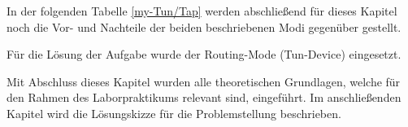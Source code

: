 \documentclass[
a4paper,     %
 headsepline, %
footsepline, %
titlepage,   %
 halfparskip,     %
 fleqn,       %
12pt         %
]{scrartcl}  %
\begin{document}
In der folgenden Tabelle \ref{my-Tun/Tap} werden abschließend für dieses Kapitel noch die Vor- und Nachteile der beiden beschriebenen Modi gegenüber gestellt. 
\newpage
\begin{table}[!h]
\centering
{}
\caption{Bridging-Mode vs. Routing-Mode}
\label{my-Tun/Tap}
\end{table}

Für die Lösung der Aufgabe wurde der Routing-Mode (Tun-Device) eingesetzt. 

Mit Abschluss dieses Kapitel wurden alle theoretischen Grundlagen, welche für den Rahmen des Laborpraktikums relevant sind, eingeführt. Im anschließenden Kapitel wird die Lösungskizze für die Problemstellung beschrieben. 
 
\label{Lösungsskizze}
\label{Auswertung}
\end{document}
